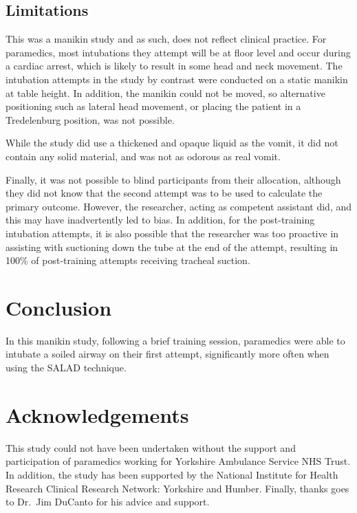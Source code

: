 \documentclass[]{article}
\begin{document}
\hypertarget{limitations}{%
\subsection{Limitations}\label{limitations}}

This was a manikin study and as such, does not reflect clinical
practice. For paramedics, most intubations they attempt will be at floor
level and occur during a cardiac arrest, which is likely to result in
some head and neck movement. The intubation attempts in the study by
contrast were conducted on a static manikin at table height. In
addition, the manikin could not be moved, so alternative positioning
such as lateral head movement, or placing the patient in a Tredelenburg
position, was not possible.

While the study did use a thickened and opaque liquid as the vomit, it
did not contain any solid material, and was not as odorous as real
vomit.

Finally, it was not possible to blind participants from their
allocation, although they did not know that the second attempt was to be
used to calculate the primary outcome. However, the researcher, acting
as competent assistant did, and this may have inadvertently led to bias.
In addition, for the post-training intubation attempts, it is also
possible that the researcher was too proactive in assisting with
suctioning down the tube at the end of the attempt, resulting in 100\%
of post-training attempts receiving tracheal suction.

\hypertarget{conclusion-1}{%
\section{Conclusion}\label{conclusion-1}}

In this manikin study, following a brief training session, paramedics
were able to intubate a soiled airway on their first attempt,
significantly more often when using the SALAD technique.

\hypertarget{acknowledgements}{%
\section{Acknowledgements}\label{acknowledgements}}

This study could not have been undertaken without the support and
participation of paramedics working for Yorkshire Ambulance Service NHS
Trust. In addition, the study has been supported by the National
Institute for Health Research Clinical Research Network: Yorkshire and
Humber. Finally, thanks goes to Dr.~Jim DuCanto for his advice and
support.
\end{document}
